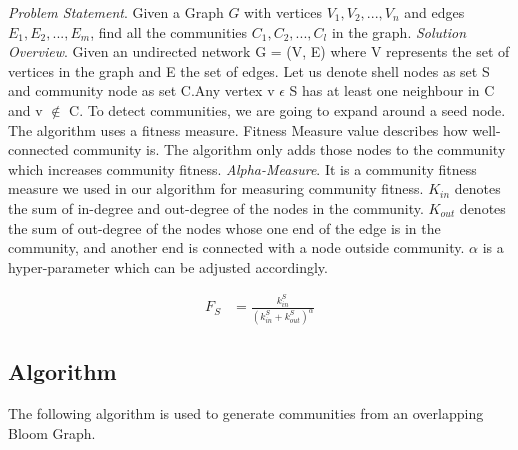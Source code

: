 \documentclass[a4paper]{article}
\begin{document}
\textit{Problem Statement}. Given a Graph $G$ with vertices $V_1, V_2,...,V_n$  and edges $E_1, E_2,...,E_m$, find all the communities $C_1, C_2,...,C_l$ in the graph. \newline
\textit{Solution Overview}. Given an undirected network G = (V, E) where V represents the set of vertices in the graph and E the set of edges. Let us denote shell nodes as set S and community node as set C.Any vertex v $\epsilon$ S has at least one neighbour in C and v $\not\in$ C. \newline
To detect communities, we are going to expand around a seed node. The algorithm uses a fitness measure. Fitness Measure value describes how well-connected community is. The algorithm only adds those nodes to the community which increases community fitness.\newline
\textit{Alpha-Measure}\cite{lancichinetti:2008}. It is a community fitness measure we used in our algorithm for measuring community fitness.\newline
$K_{in}$ denotes the sum of in-degree and out-degree of the nodes in the community.
$K_{out}$ denotes the sum of out-degree of the nodes whose one end of the edge is in the community, and another end is connected with a node outside community.\newline
$\alpha$ is a hyper-parameter which can be adjusted accordingly.

\begin{align*}
F_S 
&= \frac{k_{in}^S}{(k_{in}^S+k_{out}^S)^\alpha}  
\end{align*}





\subsection{Algorithm}
The following algorithm is used to generate communities from an overlapping Bloom Graph.
\end{document}
